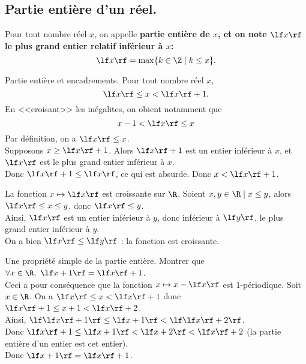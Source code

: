 \documentclass[11pt]{article}
\begin{document}
\subsection{Partie entière d'un réel.}

\begin{defi}{}{}
    Pour tout nombre réel $x$, on appelle \bf{partie entière} de $x$, et on note $\lf x \rf$ le plus grand entier relatif inférieur à $x$:
    \begin{equation*}
        \lf x \rf = \max\{k\in\Z\mid k\leq x\}.
    \end{equation*}
\end{defi}

\begin{prop}{Partie entière et encadrements.}{}
    Pour tout nombre réel $x$,
    \begin{equation*}
        \lf x \rf \leq x < \lf x \rf + 1.
    \end{equation*}    
    En <<croisant>> les inégalites, on obient notamment que
    \begin{equation*}
        x-1<\lf x \rf \leq x
    \end{equation*}
    \tcblower
    Par définition, on a $\lf x \rf \leq x$.\\
    Supposons $x\geq\lf x \rf + 1$. Alors $\lf x \rf + 1$ est un entier inférieur à $x$, et $\lf x \rf$ est le plus grand entier inférieur à $x$.\\
    Donc $\lf x \rf + 1 \leq \lf x \rf$, ce qui est absurde. Donc $x<\lf x \rf + 1$.
\end{prop}

\begin{prop}{}{}
    La fonction $x\mapsto\lf x \rf$ est croissante sur $\R$.
    \tcblower
    Soient $x,y\in\R\mid x\leq y$, alors $\lf x \rf \leq x \leq y$, donc $\lf x \rf \leq y$.\\
    Ainsi, $\lf x \rf$ est un entier inférieur à $y$, donc inférieur à $\lf y \rf$, le plus grand entier inférieur à $y$.\\
    On a bien $\lf x \rf \leq \lf y \rf$ : la fonction est croissante.
\end{prop}

\begin{ex}{Une propriété simple de la partie entière.}{}
    Montrer que $\forall x \in \R, ~ \lf x + 1 \rf = \lf x \rf + 1$.\\
    Ceci a pour conséquence que la fonction $x\mapsto x-\lf x \rf$ est $1$-périodique.
    \tcblower
    Soit $x\in\R$. On a $\lf x \rf \leq x < \lf x \rf + 1$ donc $\lf x \rf + 1 \leq x+1 < \lf x \rf + 2$.\\
    Ainsi, $\lf\lf x \rf + 1 \rf \leq \lf x + 1 \rf < \lf \lf x \rf + 2 \rf$.\\
    Donc $\lf x \rf + 1 \leq \lf x+1 \rf < \lf x + 2 \rf<\lf x \rf + 2$  (la partie entière d'un entier est cet entier).\\
    Donc $\lf x + 1 \rf = \lf x \rf + 1$.
\end{ex}
\end{document}
